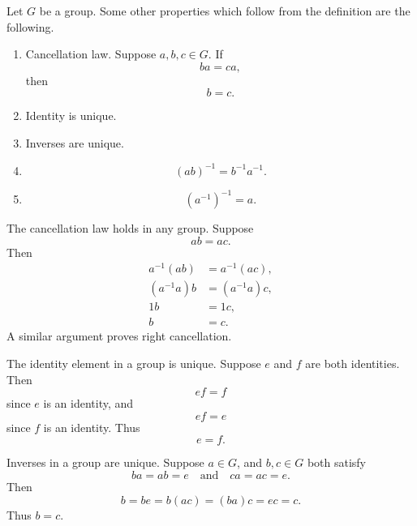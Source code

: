 \begin{definition}
    Let $G$ be a group.
    Some other properties which follow from the definition are the following.
    \begin{enumerate}
        \item Cancellation law.
        Suppose $a,b,c\in G$.
        If
        \[
            ba=ca,
        \]
        then
        \[
            b=c.
        \]

        \item Identity is unique.

        \item Inverses are unique.

        \item
        \[
            (ab)^{-1}=b^{-1}a^{-1}.
        \]

        \item
        \[
            (a^{-1})^{-1}=a.
        \]
    \end{enumerate}
\end{definition}

\begin{proposition}{
    The cancellation law holds in any group.
}
    Suppose
    \[
        ab=ac.
    \]
    Then
    \begin{align*}
        a^{-1}(ab) &= a^{-1}(ac),\\
        (a^{-1}a)b &= (a^{-1}a)c,\\
        1b &= 1c,\\
        b &= c.
    \end{align*}
    A similar argument proves right cancellation.
\end{proposition}

\begin{proposition}{
    The identity element in a group is unique.
}
    Suppose $e$ and $f$ are both identities.
    Then
    \[
        ef=f
    \]
    since $e$ is an identity, and
    \[
        ef=e
    \]
    since $f$ is an identity.
    Thus
    \[
        e=f.
    \]
\end{proposition}

\begin{proposition}{
    Inverses in a group are unique.
}
    Suppose $a\in G$, and $b,c\in G$ both satisfy
    \[
        ba=ab=e
        \quad\text{and}\quad
        ca=ac=e.
    \]
    Then
    \[
        b=be=b(ac)=(ba)c=ec=c.
    \]
    Thus $b=c$.
\end{proposition}

